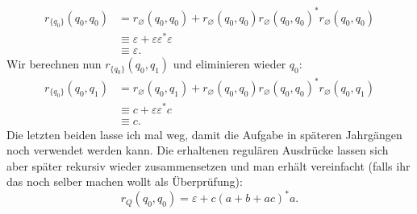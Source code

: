 \documentclass[11pt, a4paper]{article}
\let\emptyset\varnothing
\begin{document}
\begin{align*}
	r_{\{ q_0 \}}(q_0, q_0) &= r_\emptyset(q_0, q_0) + r_\emptyset(q_0, q_0) r_\emptyset(q_0, q_0)^\ast r_\emptyset(q_0, q_0)\\
	&\equiv \varepsilon + \varepsilon \varepsilon^\ast \varepsilon\\
	&\equiv \varepsilon.
\end{align*}
Wir berechnen nun $r_{\{ q_0 \}}(q_0, q_1)$ und eliminieren wieder $q_0$:
\begin{align*}
	r_{\{ q_0 \}}(q_0, q_1) &= r_\emptyset(q_0, q_1) + r_\emptyset(q_0, q_0) r_\emptyset(q_0, q_0)^\ast r_\emptyset(q_0, q_1)\\
	&\equiv c + \varepsilon \varepsilon^\ast c\\
	&\equiv c.
\end{align*}
Die letzten beiden lasse ich mal weg, damit die Aufgabe in späteren Jahrgängen noch verwendet werden kann. Die erhaltenen regulären Ausdrücke lassen sich aber später rekursiv wieder zusammensetzen und man erhält vereinfacht (falls ihr das noch selber machen wollt als Überprüfung):
$$
	r_Q(q_0, q_0) = \varepsilon + c(a+b+ac)^\ast a.
$$
\end{document}

